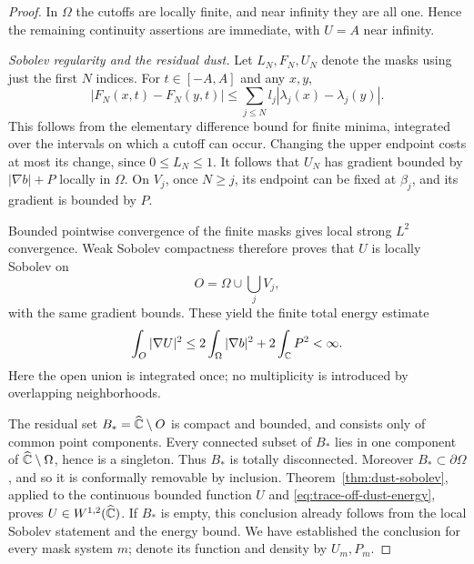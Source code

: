 \begin{proof}
In $\Omega$ the cutoffs are locally finite, and near infinity they
are all one.  Hence the remaining continuity assertions are
immediate, with $U=A$ near infinity.

\smallskip\noindent
\emph{Sobolev regularity and the residual dust.}
Let $L_N,F_N,U_N$ denote the masks using just the first $N$ indices.
For $t\in[-A,A]$ and any $x,y$,
\begin{equation}\label{eq:trace-finite-variation}
 |F_N(x,t)-F_N(y,t)|
 \leq\sum_{j\leq N}l_j|\lambda_j(x)-\lambda_j(y)|.
\end{equation}
This follows from the elementary difference bound for finite minima,
integrated over the intervals on which a cutoff can occur.  Changing
the upper endpoint costs at most its change, since $0\leq L_N\leq1$.
It follows that $U_N$ has gradient bounded by $|\nabla b|+P$ locally
in $\Omega$.  On $V_j$, once $N\geq j$, its endpoint can be fixed
at $\beta_j$, and its gradient is bounded by $P$.

Bounded pointwise convergence of the finite masks gives local strong
$L^2$ convergence.  Weak Sobolev compactness therefore proves that
$U$ is locally Sobolev on
\[
 O=\Omega\cup\bigcup_jV_j,
\]
with the same gradient bounds.  These yield the finite total energy
estimate
\begin{equation}\label{eq:trace-off-dust-energy}
 \int_O|\nabla U|^2
 \leq2\int_\Omega|\nabla b|^2+2\int_\mathbb C P^2<\infty.
\end{equation}
Here the open union is integrated once; no multiplicity is introduced
by overlapping neighborhoods.

The residual set $B_* = \widehat{\mathbb C}\setminus O$ is compact and bounded,
and consists only of common point components.  Every connected
subset of $B_*$ lies in one component of
$\widehat{\mathbb C}\setminus\Omega$, hence is a singleton.  Thus $B_*$ is
totally disconnected.  Moreover $B_*\subset\partial\Omega$, and
so it is conformally removable by inclusion.  Theorem~\ref{thm:dust-sobolev},
applied to the continuous bounded function $U$ and
\eqref{eq:trace-off-dust-energy}, proves $U\in W^{1,2}(\widehat{\mathbb C})$.
If $B_*$ is empty, this conclusion already follows from the local
Sobolev statement and the energy bound.  We have established the
conclusion for every mask system $m$; denote its function and density
by $U_m,P_m$.


\end{proof}
